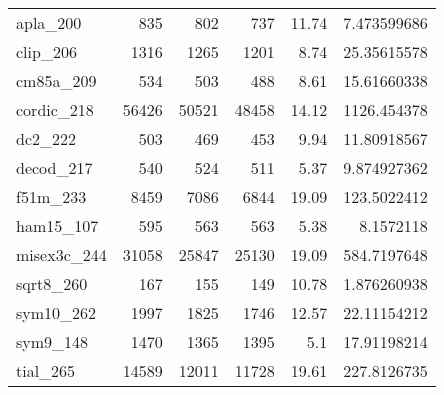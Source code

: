 \begin{table}[tbp]
\begin{tabular}{l|r|r|r|r|r}
      apla\_200                      &835                       &802                        &737                        &11.74                               &7.473599686           \\
      clip\_206                      &1316                      &1265                       &1201                       &8.74                                &25.35615578           \\
      cm85a\_209                     &534                       &503                        &488                        &8.61                                &15.61660338           \\
      cordic\_218                    &56426                     &50521                      &48458                      &14.12                               &1126.454378           \\
      dc2\_222                       &503                       &469                        &453                        &9.94                                &11.80918567           \\
      decod\_217                     &540                       &524                        &511                        &5.37                                &9.874927362           \\
      f51m\_233                      &8459                      &7086                       &6844                       &19.09                               &123.5022412           \\
      ham15\_107                     &595                       &563                        &563                        &5.38                                &8.1572118             \\
      misex3c\_244                   &31058                     &25847                      &25130                      &19.09                               &584.7197648           \\
      sqrt8\_260                     &167                       &155                        &149                        &10.78                               &1.876260938           \\
      sym10\_262                     &1997                      &1825                       &1746                       &12.57                               &22.11154212           \\
      sym9\_148                      &1470                      &1365                       &1395                       &5.1                                 &17.91198214           \\
      tial\_265                      &14589                     &12011                      &11728                      &19.61                               &227.8126735           \\ \hline
  \end{tabular}
\end{table}

